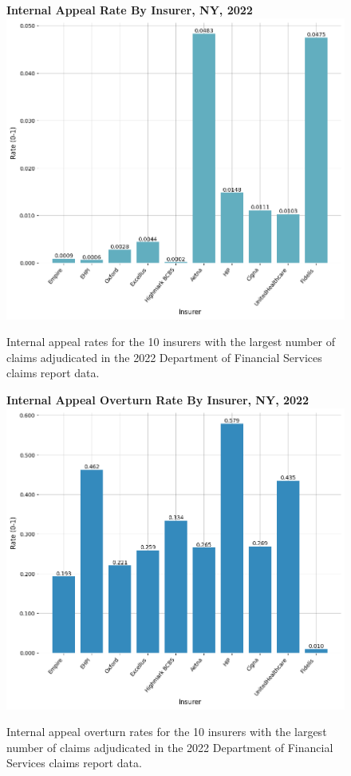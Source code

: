 \documentclass[12pt, a4paper,twoside]{report}
\theoremstyle{plain} %
\theoremstyle{definition} %
\theoremstyle{remark} %
\numberwithin{equation}{chapter}
\begin{document}
		\begin{figure}[h!]
			\centering
			\textbf{Internal Appeal Rate By Insurer, NY, 2022}
			\includegraphics[width=.8\columnwidth]{images/ny_claim_reports/appeal_rate_by_insurer.png}
			\caption{ Internal appeal rates for the 10 insurers with the largest number of claims adjudicated in the 2022 Department of Financial Services claims report data.}
			\label{nyinternalappealratebyinsurer}
		\end{figure}
		
		
		\begin{figure}[h!]
			\centering
			\textbf{Internal Appeal Overturn Rate By Insurer, NY, 2022}
			\includegraphics[width=.8\columnwidth]{images/ny_claim_reports/internal_appeal_overturn_rate_by_insurer.png}
			\caption{Internal appeal overturn rates for the 10 insurers with the largest number of claims adjudicated in the 2022 Department of Financial Services claims report data.}
			\label{nyinternalappealoverturnratebyinsurer}
		\end{figure}
		
\end{document}
